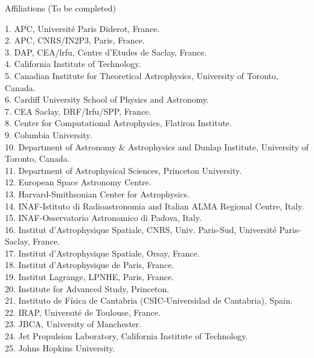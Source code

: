 \documentclass[PICOReport.tex]{subfiles}
\begin{document}
\newpage
\Large  {\centerline {Affiliations  (To be completed)}}


\begin{multicols}{2}
\raggedright 
\scriptsize {
1. APC, Universit\'e Paris Diderot, France.  \\ 
2. APC, CNRS/IN2P3, Paris, France.  \\
3. DAP, CEA/lrfu, Centre d'Etudes de Saclay, France.  \\
4. California Institute of Technology.  \\
5. Canadian Institute for Theoretical Astrophysics, University of Toronto, Canada.  \\
6. Cardiff University School of Physics and Astronomy.  \\
7. CEA Saclay, DRF/Irfu/SPP, France.  \\
8. Center for Computational Astrophysics, Flatiron Institute.  \\
9. Columbia University.  \\
10. Department of Astronomy \& Astrophysics and Dunlap Institute, University of Toronto, Canada.  \\
11. Department of Astrophysical Sciences, Princeton University.  \\
12. European Space Astronomy Centre.  \\
13. Harvard-Smithsonian Center for Astrophysics.  \\
14. INAF-Istituto di Radioastronomia and Italian ALMA Regional Centre, Italy.  \\
15. INAF-Osservatorio Astronomico di Padova, Italy.  \\
16. Institut d'Astrophysique Spatiale, CNRS, Univ. Paris-Sud, Universit\'e Paris-Saclay, France.  \\
17. Institut d'Astrophysique Spatiale, Orsay, France.  \\
18. Institut d'Astrophysique de Paris, France.  \\
19. Institut Lagrange, LPNHE,  Paris, France.  \\
20. Institute for Advanced Study, Princeton.  \\
21. Instituto de F\'isica de Cantabria (CSIC-Universidad de Cantabria), Spain.  \\
22. IRAP, Universit\'e de Toulouse, France.  \\
23. JBCA, University of Manchester.  \\
24. Jet Propulsion Laboratory, California Institute of Technology.  \\
25. Johns Hopkins University.  \\
}
\end{multicols}
\end{document}
